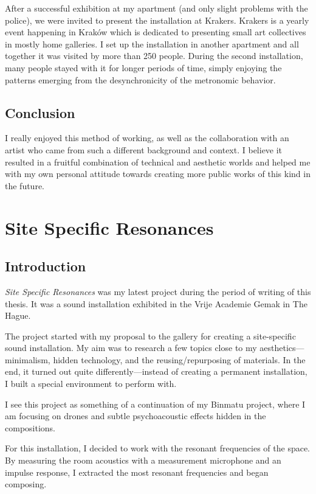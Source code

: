 \documentclass[12pt,a4paper,oneside]{report}
\begin{document}
After a successful exhibition at my apartment (and only slight problems with the police), we were invited to present the installation at Krakers. Krakers is a yearly event happening in Kraków which is dedicated to presenting small art collectives in mostly home galleries. I set up the installation in another apartment and all together it was visited by more than 250 people. During the second installation, many people stayed with it for longer periods of time, simply enjoying the patterns emerging from the desynchronicity of the metronomic behavior.

\subsection{Conclusion}

I really enjoyed this method of working, as well as the collaboration with an artist who came from such a different background and context. I believe it resulted in a fruitful combination of technical and aesthetic worlds and helped me with my own personal attitude towards creating more public works of this kind in the future.


\section{Site Specific Resonances}

\subsection{Introduction}

\emph{Site Specific Resonances} was my latest project during the period of writing of this thesis. It was a sound installation exhibited in the Vrije Academie Gemak in The Hague.

The project started with my proposal to the gallery for creating a site-specific sound installation. My aim was to research a few topics close to my aesthetics---minimalism, hidden technology, and the reusing/repurposing of materials. In the end, it turned out quite differently---instead of creating a permanent installation, I built a special environment to perform with. 

I see this project as something of a continuation of my Binmatu project, where I am focusing on drones and subtle psychoacoustic effects hidden in the compositions.

For this installation, I decided to work with the resonant frequencies of the space. By measuring the room acoustics with a measurement microphone and an impulse response, I extracted the most resonant frequencies and began composing.
\end{document}
